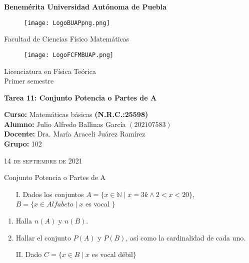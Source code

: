 \documentclass[12pt]{article}
\begin{document}
\thispagestyle{empty} 
\begin{center} \LARGE{\bf Benemérita Universidad Autónoma de Puebla} \\[0.5cm]
\begin{figure}[htb] \centering \texttt{[image: LogoBUAPpng.png]} \end{figure}
\LARGE{Facultad de Ciencias Físico Matemáticas}\\[0.5cm]
\begin{figure}[htb] \centering \texttt{[image: LogoFCFMBUAP.png]} \end{figure} 
\Large{Licenciatura en Física Teórica}\\[0.5cm]
\large{Primer semestre} \end{center}
\begin{center} { \Large \bfseries{Tarea 11: Conjunto Potencia o Partes de A }} \\ \end{center}
\large{\bf Curso: } Matemáticas básicas \textbf{(N.R.C.:25598)}\\
\large{\bf Alumno:} Julio Alfredo Ballinas García $\left(202107583\right)$ \\
\large{\bf Docente:} Dra. María Araceli Juárez Ramírez\\
\large{\bf Grupo:} 102\\ \begin{center} 
\vfill
\textsc{14 de septiembre de 2021} \end{center}  
\newpage
\sffamily
{\LARGE{\sffamily Conjunto Potencia o Partes de A\\}}

\begin{enumerate}
    \item [I.] Dados los conjuntos $A = \{x\in\mathbb{N}\mid x=3k \wedge2<x<20\}$, \\
    $B = \{x\in Alfabeto\mid x $ es vocal $ \}$
\end{enumerate}

\begin{enumerate}
    \item Halla $n(A)$ y $n(B)$.
    \item Hallar el conjunto $P(A)$ y $P(B)$, así como la cardinalidad de cada uno.\\
\end{enumerate}

\begin{enumerate}
    \item [II.] Dado $C = \{x\in B \mid x $ es vocal débil$\}$
\end{enumerate}
\end{document}

